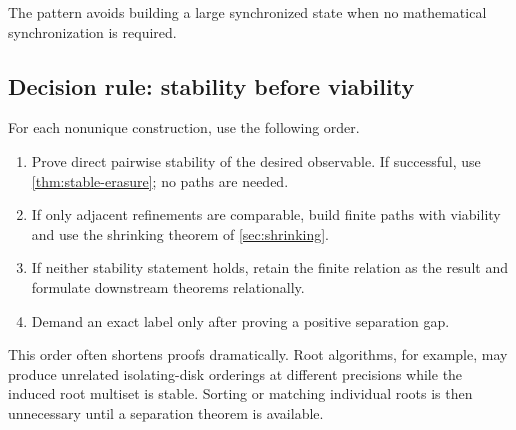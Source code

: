 The pattern avoids building a large synchronized state when no mathematical
synchronization is required.

\subsection{Decision rule: stability before viability}

For each nonunique construction, use the following order.

\begin{enumerate}[label=\textbf{S\arabic*.}]
\item Prove direct pairwise stability of the desired observable.  If successful,
      use \cref{thm:stable-erasure}; no paths are needed.
\item If only adjacent refinements are comparable, build finite paths with
      viability and use the shrinking theorem of \cref{sec:shrinking}.
\item If neither stability statement holds, retain the finite relation as the
      result and formulate downstream theorems relationally.
\item Demand an exact label only after proving a positive separation gap.
\end{enumerate}

This order often shortens proofs dramatically.  Root algorithms, for example,
may produce unrelated isolating-disk orderings at different precisions while
the induced root multiset is stable.  Sorting or matching individual roots is
then unnecessary until a separation theorem is available.

